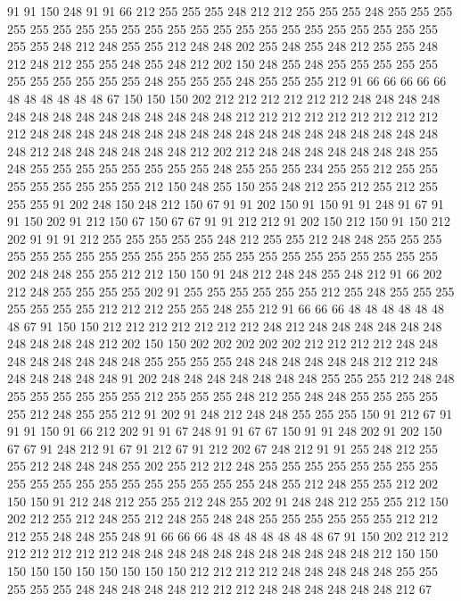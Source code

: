 91 91 150 248 91 91 66 212 255 255 255 248 212 212 255 255 255 248 255 255
255 255 255 255 255 255 255 255 255 255 255 255 255 255 255 255 255 255 255 255
255 255 248 212 248 255 255 212 248 248 202 255 248 255 248 212 255 255 248 212
248 212 255 255 248 255 248 212 202 150 248 255 248 255 255 255 255 255 255 255
255 255 255 255 248 255 255 255 248 255 255 255 212 91 66 66 66 66 66 48
48 48 48 48 48 67 150 150 150 202 212 212 212 212 212 212 248 248 248 248
248 248 248 248 248 248 248 248 248 248 212 212 212 212 212 212 212 212 212 212
248 248 248 248 248 248 248 248 248 248 248 248 248 248 248 248 248 248 248 212
248 248 248 248 248 248 212 202 212 248 248 248 248 248 248 248 255 248 255 255
255 255 255 255 255 255 248 255 255 255 234 255 255 212 255 255 255 255 255 255
255 255 212 150 248 255 150 255 248 212 255 212 255 212 255 255 255 91 202 248
150 248 212 150 67 91 91 202 150 91 150 91 91 248 91 67 91 91 150 202
91 212 150 67 150 67 67 91 91 212 212 91 202 150 212 150 91 150 212 202
91 91 91 212 255 255 255 255 255 248 212 255 255 212 248 248 255 255 255 255
255 255 255 255 255 255 255 255 255 255 255 255 255 255 255 255 255 255 202 248
248 255 255 212 212 150 150 91 248 212 248 248 255 248 212 91 66 202 212 248
255 255 255 255 202 91 255 255 255 255 255 255 212 255 248 255 255 255 255 255
255 255 212 212 212 255 255 248 255 212 91 66 66 66 48 48 48 48 48 48
48 67 91 150 150 212 212 212 212 212 212 212 248 212 248 248 248 248 248 248
248 248 248 248 212 202 150 150 202 202 202 202 202 212 212 212 212 248 248 248
248 248 248 248 248 255 255 255 255 248 248 248 248 248 248 212 212 248 248 248
248 248 248 91 202 248 248 248 248 248 248 248 255 255 255 212 248 248 255 255
255 255 255 255 212 255 255 255 248 212 255 248 248 255 255 255 255 255 212 248
255 255 212 91 202 91 248 212 248 248 255 255 255 150 91 212 67 91 91 91
150 91 66 212 202 91 91 67 248 91 91 67 67 150 91 91 248 202 91 202
150 67 67 91 248 212 91 67 91 212 67 91 212 202 67 248 212 91 91 255
248 212 255 255 212 248 248 248 255 202 255 212 212 248 255 255 255 255 255 255
255 255 255 255 255 255 255 255 255 255 255 255 255 248 255 212 248 255 255 212
202 150 150 91 212 248 212 255 255 212 248 255 202 91 248 248 212 255 255 212
150 202 212 255 212 248 255 212 248 255 248 248 255 255 255 255 255 255 212 212
212 255 248 248 255 248 91 66 66 66 48 48 48 48 48 48 48 67 91 150
202 212 212 212 212 212 212 212 248 248 248 248 248 248 248 248 248 248 248 212
150 150 150 150 150 150 150 150 150 150 212 212 212 212 248 248 248 248 248 255
255 255 255 255 248 248 248 248 248 212 212 212 248 248 248 248 248 248 212 67
